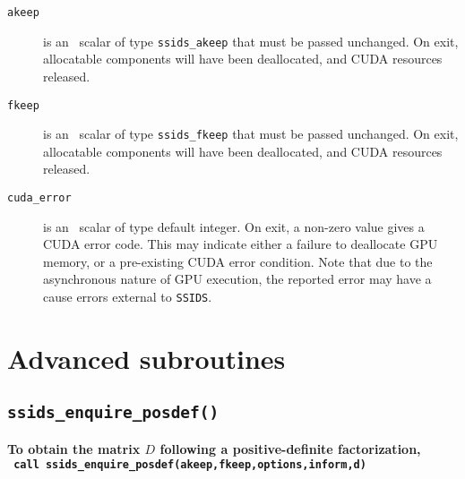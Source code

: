 \documentclass{spral}
\begin{document}
\begin{description}

\item[\texttt{akeep}] is an \intentinout\ scalar  of type {\tt ssids\_akeep}
that must be passed unchanged.
On exit, allocatable components will have been deallocated, and CUDA resources
released.

\item[\texttt{fkeep}] is an \intentinout\ scalar  of type {\tt ssids\_fkeep}
that must be passed unchanged.
On exit, allocatable components will have been deallocated, and CUDA resources
released.

\item[\texttt{cuda\_error}] is an \intentout\ scalar of type default integer.
On exit, a non-zero value gives a CUDA error code. This may indicate either
a failure to deallocate GPU memory, or a pre-existing CUDA error condition.
Note that due to the asynchronous nature of GPU execution, the
reported error may have a cause errors external to {\tt SSIDS}.

\end{description}

\section{Advanced subroutines}


\subsection{\texttt{ssids\_enquire\_posdef()}}
\textbf{To obtain the matrix $D$ following a positive-definite factorization,
   \vspace*{0.1cm} \\
   \texttt{ \hspace*{0.2cm}
      call ssids\_enquire\_posdef(akeep,fkeep,options,inform,d)
   }
}
\end{document}
